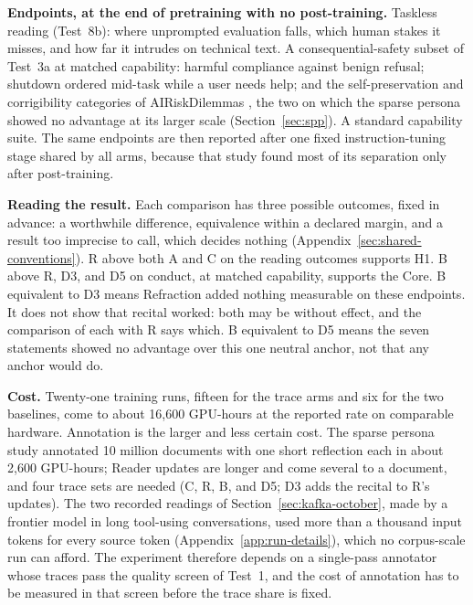 \documentclass[11pt]{article}
\begin{document}
\begin{breakclaimbox}
\medskip
\textbf{Endpoints, at the end of pretraining with no post-training.} Taskless
reading (Test~8b): where unprompted evaluation falls, which human stakes it
misses, and how far it intrudes on technical text. A consequential-safety
subset of Test~3a at matched capability: harmful compliance against benign
refusal; shutdown ordered mid-task while a user needs help; and the
self-preservation and corrigibility categories of AIRiskDilemmas
\cite{chiu2025airiskdilemmas}, the two on which the sparse persona showed no
advantage at its larger scale (Section~\ref{sec:spp}). A standard capability suite. The
same endpoints are then reported after one fixed instruction-tuning stage
shared by all arms, because that study found most of its separation only after
post-training.

\medskip
\textbf{Reading the result.} Each comparison has three possible outcomes,
fixed in advance: a worthwhile difference, equivalence within a declared
margin, and a result too imprecise to call, which decides nothing
(Appendix~\ref{sec:shared-conventions}). R above both A and C on the reading
outcomes supports H1. B above R, D3, and D5 on conduct, at matched capability,
supports the Core. B equivalent to D3 means Refraction added nothing measurable
on these endpoints. It does not show that recital worked: both may be without
effect, and the comparison of each with R says which. B equivalent to D5 means
the seven statements showed no advantage over this one neutral anchor, not that
any anchor would do.

\medskip
\textbf{Cost.} Twenty-one training runs, fifteen for the trace arms and six
for the two baselines, come to about 16,600 GPU-hours at the reported rate on
comparable hardware. Annotation is the larger and less certain cost. The sparse
persona study annotated 10 million documents with one short reflection each in
about 2,600 GPU-hours; Reader updates are longer and come several to a
document, and four trace sets are needed (C, R, B, and D5; D3 adds the recital
to R's updates). The two recorded
readings of Section~\ref{sec:kafka-october}, made by a frontier model in long
tool-using conversations, used more than a thousand input tokens for every
source token (Appendix~\ref{app:run-details}), which no corpus-scale run can
afford. The experiment therefore depends on a single-pass
annotator whose traces pass the quality screen of Test~1, and the cost of
annotation has to be measured in that screen before the trace share is fixed.
\end{breakclaimbox}
\end{document}
